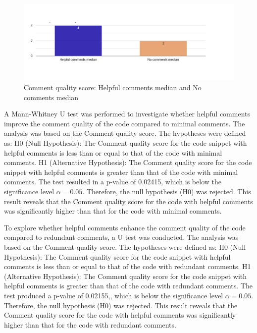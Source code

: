 \begin{figure} [H]
  \centering
  \includegraphics[scale=0.5]{figures/h-0-q4.png}
  \caption{Comment quality score: Helpful comments median and No comments median}
  \label{fig:AnhangsChor}
\end{figure}


A Mann-Whitney U test was performed to investigate whether helpful comments improve the comment quality of the code compared to minimal comments. The analysis was based on the Comment quality score. The hypotheses were defined as: H0 (Null Hypothesis): The Comment quality score for the code snippet with helpful comments is less than or equal to that of the code with minimal comments.  H1 (Alternative Hypothesis): The Comment quality score for the code snippet with helpful comments is greater than that of the code with minimal comments. The test resulted in a p-value of 0.02415, which is below the significance level $\alpha = 0.05$. Therefore, the null hypothesis (H0) was rejected. This result reveals that the Comment quality score for the code with helpful comments was significantly higher than that for the code with minimal comments.





To explore whether helpful comments enhance the comment quality of the code compared to redundant comments, a  U test was conducted.  The analysis was based on the Comment quality score. The hypotheses were defined as: H0 (Null Hypothesis): The Comment quality score for the code snippet with helpful comments is less than or equal to that of the code with redundant comments.  H1 (Alternative Hypothesis): The Comment quality score for the code snippet with helpful comments is greater than that of the code with redundant comments. The test produced a p-value of 0.02155,, which is below the significance level $\alpha = 0.05$. Therefore, the null hypothesis (H0) was rejected. This result reveals that the Comment quality score for the code with helpful comments was significantly higher than that for the code with redundant comments. 



